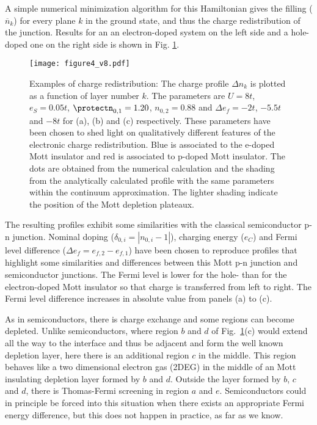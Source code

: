 \documentclass[twocolumn, preprintnumbers,prb,aps,amssymb,showpacs]{revtex4}
\begin{document}
A simple numerical minimization algorithm for this Hamiltonian gives
the filling ($\overline{n}_{k}$) for every plane $k$ in the ground state, and thus the
charge redistribution of the junction. Results for an
an electron-doped system on the left side and a hole-doped one on the right side is shown in Fig. \ref{fig2}.
\begin{figure}[tbp]
\par
\begin{center}
\texttt{[image: figure4\_v8.pdf]}
\end{center}
\caption{Examples of charge redistribution: The charge profile $\Delta n_k$ is plotted as a function of layer number $k$. The parameters are $U=8t$, $e_{S}=0.05t$, $\protect%
n_{0,1}=1.20$, $n_{0,2}=0.88$ and $\Delta e_f=-2t$, $-5.5t$ and $-8t$ for (a), (b) and (c) respectively. These parameters have been chosen to shed light on qualitatively different features of the electronic charge redistribution. Blue is associated to the e-doped Mott insulator
and red is associated to p-doped Mott insulator. The dots are obtained from the
numerical calculation and the shading from the analytically calculated profile
with the same parameters within the continuum approximation. The lighter shading indicate the position of the Mott depletion plateaux.}
\label{fig2}
\end{figure}
The resulting profiles exhibit some similarities with the classical
semiconductor p-n junction. Nominal doping ($\delta_{0,i}=\left| n_{0,i}-1\right| $), charging energy ($%
e_{C}$) and Fermi level difference ($\Delta e_{f}=e_{f,2}-e_{f,1}$) have been chosen to
reproduce profiles that highlight some similarities and
differences between this Mott p-n junction and semiconductor junctions. The Fermi level is lower for the hole- than for the electron-doped Mott insulator so that charge is transferred from left to right. The Fermi level difference increases in absolute value from panels (a) to (c). 
  
As in semiconductors, there is charge exchange and some
regions can become depleted. Unlike semiconductors, where region $b$ and $d$ of Fig.~\ref{fig2}(c) would extend all the way to the interface and thus be adjacent and form the
well known depletion layer, here there is an additional region $c$ in the
middle. This region behaves like a two dimensional electron gas (2DEG) in the
middle of an Mott insulating depletion layer formed by $b$ and $d$. Outside
the layer formed by $b$, $c$ and $d$, there is Thomas-Fermi screening in
region $a$ and $e$. Semiconductors could in principle be forced into this situation when there exists an appropriate Fermi energy difference, but this does not happen in practice, as far as we know.  
\end{document}
